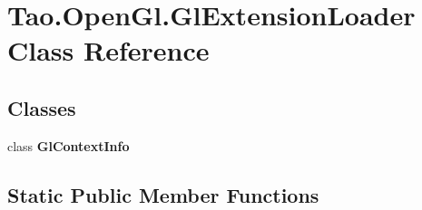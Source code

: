 \hypertarget{class_tao_1_1_open_gl_1_1_gl_extension_loader}{
\section{Tao.OpenGl.GlExtensionLoader Class Reference}
\label{class_tao_1_1_open_gl_1_1_gl_extension_loader}
}
\subsection*{Classes}
\begin{DoxyCompactItemize}
\item 
class {\bfseries GlContextInfo}
\end{DoxyCompactItemize}
\subsection*{Static Public Member Functions}
